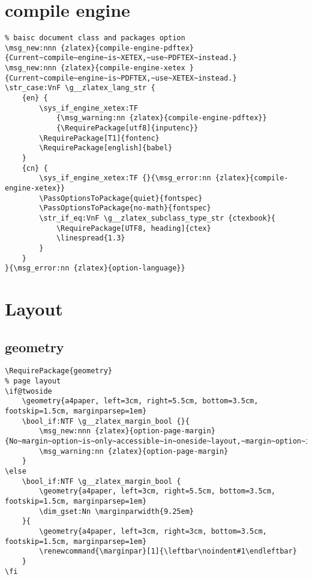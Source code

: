 \section{compile engine}
\begin{verbatim}
% baisc document class and packages option
\msg_new:nnn {zlatex}{compile-engine-pdftex}{Current~compile~engine~is~XETEX,~use~PDFTEX~instead.}
\msg_new:nnn {zlatex}{compile-engine-xetex }{Current~compile~engine~is~PDFTEX,~use~XETEX~instead.}
\str_case:VnF \g__zlatex_lang_str {
    {en} { 
        \sys_if_engine_xetex:TF 
            {\msg_warning:nn {zlatex}{compile-engine-pdftex}}
            {\RequirePackage[utf8]{inputenc}}
        \RequirePackage[T1]{fontenc}
        \RequirePackage[english]{babel}
    }
    {cn} {
        \sys_if_engine_xetex:TF {}{\msg_error:nn {zlatex}{compile-engine-xetex}}
        \PassOptionsToPackage{quiet}{fontspec}
        \PassOptionsToPackage{no-math}{fontspec}
        \str_if_eq:VnF \g__zlatex_subclass_type_str {ctexbook}{
            \RequirePackage[UTF8, heading]{ctex}
            \linespread{1.3}
        }
    }
}{\msg_error:nn {zlatex}{option-language}}   
\end{verbatim}

\section{Layout}
\subsection{geometry}
\begin{verbatim}
\RequirePackage{geometry}
% page layout 
\if@twoside 
    \geometry{a4paper, left=3cm, right=5.5cm, bottom=3.5cm, footskip=1.5cm, marginparsep=1em}
    \bool_if:NTF \g__zlatex_margin_bool {}{
        \msg_new:nnn {zlatex}{option-page-margin}{No~margin~option~is~only~accessible~in~oneside~layout,~margin~option~is~now~enabled~by~default.} 
        \msg_warning:nn {zlatex}{option-page-margin}
    }
\else 
    \bool_if:NTF \g__zlatex_margin_bool {
        \geometry{a4paper, left=3cm, right=5.5cm, bottom=3.5cm, footskip=1.5cm, marginparsep=1em}
        \dim_gset:Nn \marginparwidth{9.25em}
    }{
        \geometry{a4paper, left=3cm, right=3cm, bottom=3.5cm, footskip=1.5cm, marginparsep=1em}
        \renewcommand{\marginpar}[1]{\leftbar\noindent#1\endleftbar}
    }
\fi
\end{verbatim}


